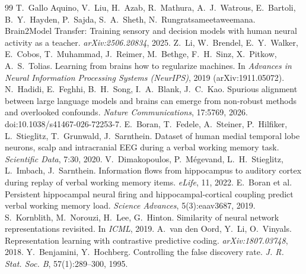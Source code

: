 \documentclass[conference]{IEEEtran}
\begin{document}
\balance
\begin{thebibliography}{99}
 T.~Gallo Aquino, V.~Liu, H.~Azab, R.~Mathura, A.~J.~Watrous, E.~Bartoli, B.~Y.~Hayden, P.~Sajda, S.~A.~Sheth, N.~Rungratsameetaweemana.
  Brain2Model Transfer: Training sensory and decision models with human neural activity as a teacher.
  \emph{arXiv:2506.20834}, 2025.
 Z.~Li, W.~Brendel, E.~Y.~Walker, E.~Cobos, T.~Muhammad, J.~Reimer, M.~Bethge, F.~H.~Sinz, X.~Pitkow, A.~S.~Tolias.
  Learning from brains how to regularize machines. In \emph{Advances in Neural Information Processing Systems (NeurIPS)}, 2019 (arXiv:1911.05072).
 N.~Hadidi, E.~Feghhi, B.~H.~Song, I.~A.~Blank, J.~C.~Kao.
  Spurious alignment between large language models and brains can emerge from non-robust methods and overlooked confounds.
  \emph{Nature Communications}, 17:5769, 2026. doi:10.1038/s41467-026-72253-7.
 E.~Boran, T.~Fedele, A.~Steiner, P.~Hilfiker, L.~Stieglitz, T.~Grunwald, J.~Sarnthein.
  Dataset of human medial temporal lobe neurons, scalp and intracranial EEG during a verbal working memory task.
  \emph{Scientific Data}, 7:30, 2020.
 V.~Dimakopoulos, P.~M\'egevand, L.~H.~Stieglitz, L.~Imbach, J.~Sarnthein.
  Information flows from hippocampus to auditory cortex during replay of verbal working memory items.
  \emph{eLife}, 11, 2022.
 E.~Boran et al.
  Persistent hippocampal neural firing and hippocampal-cortical coupling predict verbal working memory load.
  \emph{Science Advances}, 5(3):eaav3687, 2019.
 S.~Kornblith, M.~Norouzi, H.~Lee, G.~Hinton.
  Similarity of neural network representations revisited. In \emph{ICML}, 2019.
 A.~van den Oord, Y.~Li, O.~Vinyals.
  Representation learning with contrastive predictive coding. \emph{arXiv:1807.03748}, 2018.
 Y.~Benjamini, Y.~Hochberg.
  Controlling the false discovery rate. \emph{J. R. Stat. Soc. B}, 57(1):289--300, 1995.
\end{thebibliography}
\end{document}
